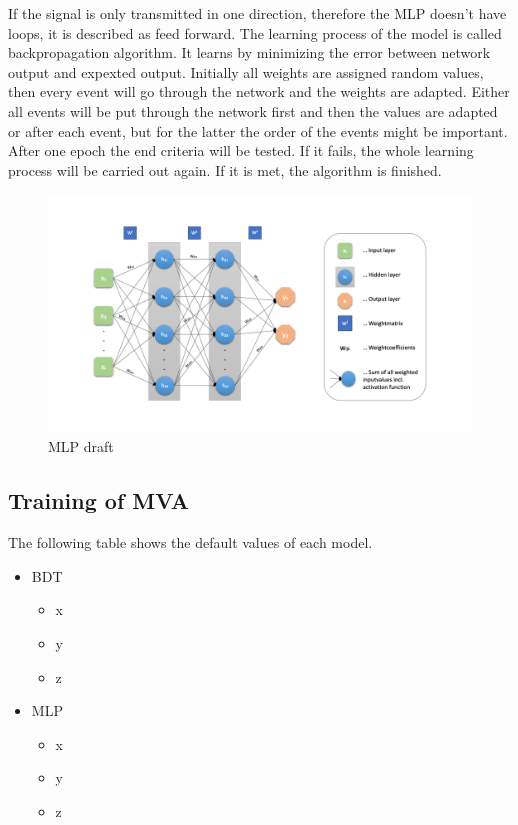 \documentclass[11pt]{scrartcl}
\begin{document}
	If the signal is only transmitted in one direction, therefore the MLP doesn't have loops, it is described as feed forward. The learning process of the model is called backpropagation algorithm. It learns by minimizing the error between network output and expexted output. Initially all weights are assigned random values, then every event will go through the network and the weights are adapted. Either all events will be put through the network first and then the values are adapted or after each event, but for the latter the order of the events might be important. After one epoch the end criteria will be tested. If it fails, the whole learning process will be carried out again. If it is met, the algorithm is finished.
	
\begin{figure}[H]
	\begin{center}
	\includegraphics[width=1\textwidth]{figures/MLP.png}
	\caption{MLP draft}
	\end{center}
\end{figure}

	\subsection{Training of MVA}
	
	The following table shows the default values of each model.
	
		\begin{itemize}
  			\item BDT
  					\begin{itemize}
  					\item x
  					\item y
  					\item z
  					\end{itemize}
  		  	\item MLP
  					\begin{itemize}
  					\item x
  					\item y
  					\item z
  					\end{itemize}		
		\end{itemize}
	
\end{document}
